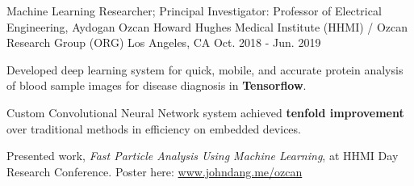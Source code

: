 \cventry
    {Machine Learning Researcher; Principal Investigator: Professor of Electrical Engineering, Aydogan Ozcan} %
    {Howard Hughes Medical Institute (HHMI) / Ozcan Research Group (ORG)} %
    {Los Angeles, CA} %
    {Oct. 2018 - Jun. 2019} %
    {
      \begin{cvitems} %
        \item {Developed deep learning system for quick, mobile, and accurate protein analysis of blood sample images for disease diagnosis in \textbf{Tensorflow}.}
        \item {Custom Convolutional Neural Network system achieved \textbf{tenfold improvement} over traditional methods in efficiency on embedded devices.}
        \item Presented work, \textit{Fast Particle Analysis Using Machine Learning}, at HHMI Day Research Conference. Poster here: \href{https://www.johndang.me/ozcan}{www.johndang.me/ozcan}
      \end{cvitems}
    }